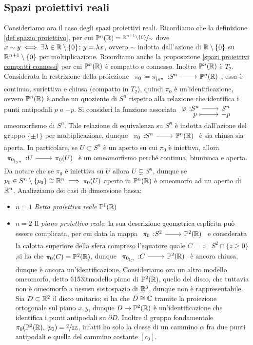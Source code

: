 	\subsection{Spazi proiettivi reali}
Consideriamo ora il caso degli spazi proiettivi reali. \newline
Ricordiamo che la definizione \ref{def spazio proiettivo}, per cui $\mathbb{P}^n(\mathbb{R})=\nicefrac{\mathbb{R}^{n+1}\setminus\{0\}}{\sim}$ dove $x\sim y \iff \exists\lambda\in\mathbb{R}\setminus\{0\} \colon y=\lambda x$, ovvero $\sim$ indotta dall'azione di $\mathbb{R}\setminus\{0\}$ su $\mathbb{R}^{n+1}\setminus\{0\}$ per moltiplicazione. Ricordiamo anche la proposizione \ref{spazi proiettivi compatti connessi} per cui $\mathbb{P}^n(\mathbb{R})$ è compatto e connesso. Inoltre $\mathbb{P}^n(\mathbb{R})$ è $T_2$. Considerata la restrizione della proiezione $\funz {\pi_0\coloneqq \pi_{|_{S^n}}} {S^n} {\mathbb{P}^n(\realset)}$, essa è continua, suriettiva e chiusa (compatto in $T_2$), quindi $\pi_0$ è un'identificazione, ovvero $\mathbb{P}^n(\mathbb{R})$ è anche un quoziente di $S^n$ rispetto alla relazione che identifica i punti antipodali $p$ e $-p$. Si consideri la funzione associata $\funztot \phi {S^n} {S^n} p {-p}$ omeomorfismo di $S^n$. Tale relazione di equivalenza su $S^n$ è indotta dall'azione del gruppo $\{\pm 1\}$ per moltiplicazione, dunque $\funz {\pi_0} {S^n} {\mathbb{P}^n(\realset)}$ è sia chiusa sia aperta. In particolare, se $U\subset S^n$ è un aperto su cui $\pi_0$ è iniettiva, allora $\funz {\pi_{0_{|_{S^n}}}} U {\pi_0(U)}$ è un omeomorfismo perché continua, biunivoca e aperta. Da notare che se $\pi_0$ è iniettiva su $U$ allora $U\subsetneq S^n$, dunque se $p_0\in S^n\setminus\{p_0\}\cong\mathbb{R}^n \implies \pi_0(U)$ aperto in $\mathbb{P}^n(\mathbb{R})$ è omeomorfo ad un aperto di $\mathbb{R}^n$.\newline
Analizziamo dei casi di dimensione bassa:
	\begin{itemize}
		\item \underline{$n=1$} \textit{Retta proiettiva reale} $\mathbb{P}^1(\mathbb{R})$ 
		\item \underline{$n=2$} Il \textit{piano proiettivo reale}, la sua descrizione geometrica esplicita può essere complicata, per cui data la mappa $\funz {\pi_0	} {S^2} {\mathbb{P}^2(\realset)}$ e considerata la calotta superiore della sfera compreso l'equatore quale $C=\coloneqq S^2\cap\{z\geq 0\}$,si ha che $\pi_0(C)=\mathbb{P}^2(\mathbb{R})$, dunque $\funz {\pi_{0_{|_{C}}}} C {\mathbb{P}^2(\realset)}$ è ancora chiusa, dunque è ancora un'identificazione. Consideriamo ora un altro modello omeomorfo, detto \text6153it{modello piano di $\mathbb{P}^2(\mathbb{R})$}, quello del disco, che tuttavia non è omeomorfo a nesusn sottospazio di $\mathbb{R}^3$, dunque non è rappresentabile. Sia $D\subset\mathbb{R}^2$ il disco unitario; si ha che $D\cong\mathbb{C}$ tramite la proiezione ortogonale sul piano $x,y$, dunque $D\rightarrow \mathbb{P}^2(\mathbb{R})$ è un'identificazione che identifica i punti antipodali su $\partial{D}$. Inoltre il gruppo fondamentale $\pi_0(\mathbb{P}^2(\realset),\ p_0)=\nicefrac{\integerset}{2\integerset}$, infatti ho solo la classe di un cammino $\alpha$ fra due punti antipodali e quella del cammino costante $[c_0]$.
	\end{itemize}
